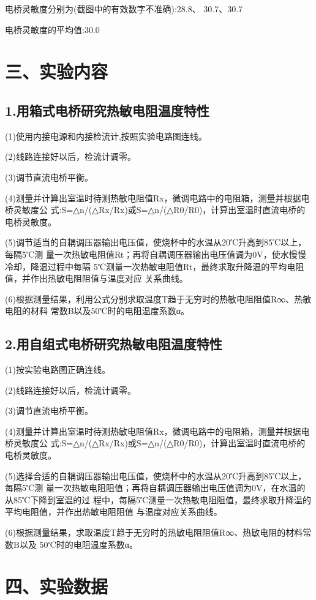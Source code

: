 \documentclass{article}
\begin{document}
电桥灵敏度分别为(截图中的有效数字不准确):28.8、 30.7、30.7

电桥灵敏度的平均值:30.0




    

\section*{三、实验内容}
\subsection*{1.用箱式电桥研究热敏电阻温度特性}
(1)使用内接电源和内接检流计,按照实验电路图连线。

(2)线路连接好以后，检流计调零。

(3)调节直流电桥平衡。

(4)测量并计算出室温时待测热敏电阻值Rx，微调电路中的电阻箱，测量并根据电桥灵敏度公
式:S=△n/(△Rx/Rx)或S=△n/(△R0/R0)，计算出室温时直流电桥的电桥灵敏度。

(5)调节适当的自耦调压器输出电压值，使烧杯中的水温从20℃升高到85℃以上，每隔5℃测
量一次热敏电阻值Rt；再将自耦调压器输出电压值调为0V，使水慢慢冷却，降温过程中每隔
5℃测量一次热敏电阻值Rt，最终求取升降温的平均电阻值，并作出热敏电阻阻值与温度对应
关系曲线。

(6)根据测量结果，利用公式分别求取温度T趋于无穷时的热敏电阻阻值R∞、热敏电阻的材料
常数B以及50℃时的电阻温度系数α。

\subsection*{2.用自组式电桥研究热敏电阻温度特性}

(1)按实验电路图正确连线。

(2)线路连接好以后，检流计调零。

(3)调节直流电桥平衡。

(4)测量并计算出室温时待测热敏电阻值Rx，微调电路中的电阻箱，测量并根据电桥灵敏度公
式:S=△n/(△Rx/Rx)或S=△n/(△R0/R0)，计算出室温时直流电桥的电桥灵敏度。

(5)选择合适的自耦调压器输出电压值，使烧杯中的水温从20℃升高到85℃以上，每隔5℃测
量一次热敏电阻阻值；再将自耦调压器输出电压值调为0V，在水温的从85℃下降到室温的过
程中，每隔5℃测量一次热敏电阻阻值，最终求取升降温的平均电阻值，并作出热敏电阻阻值
与温度对应关系曲线。

(6)根据测量结果，求取温度T趋于无穷时的热敏电阻阻值R∞、热敏电阻的材料常数B以及
50℃时的电阻温度系数α。


\section*{四、实验数据}
\end{document}
